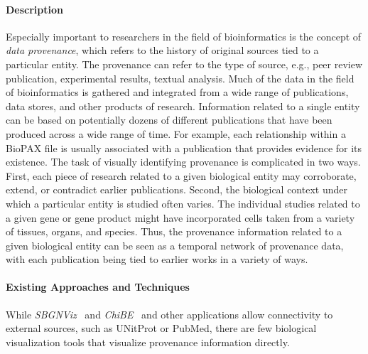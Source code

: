 \documentclass[twocolumn]{bmcart}%
\begin{document}
\paragraph*{Description}

Especially important to researchers in the field of bioinformatics is the concept of \textit{data provenance}, which refers to the history of original sources tied to a particular entity.
The provenance can refer to the type of source, e.g., peer review publication, experimental results, textual analysis.
Much of the data in the field of bioinformatics is gathered and integrated from a wide range of publications, data stores, and other products of research.
Information related to a single entity can be based on potentially dozens of different publications that have been produced across a wide range of time.
For example, each relationship within a BioPAX file is usually associated with a publication that provides evidence for its existence.
The task of visually identifying provenance is complicated in two ways.
First, each piece of research related to a given biological entity may corroborate, extend, or contradict earlier publications.
Second, the biological context under which a particular entity is studied often varies.
The individual studies related to a given gene or gene product might have incorporated cells taken from a variety of tissues, organs, and species.
Thus, the provenance information related to a given biological entity can be seen as a temporal network of provenance data, with each publication being tied to earlier works in a variety of ways.


\paragraph*{Existing Approaches and Techniques} While \textit{SBGNViz}~\cite{SBGNViz2015} and \textit{ChiBE}~\cite{Babur2010chibe} and other applications allow connectivity to external sources, such as UNitProt or PubMed, there are few biological visualization tools that visualize provenance information directly.

\end{document}
